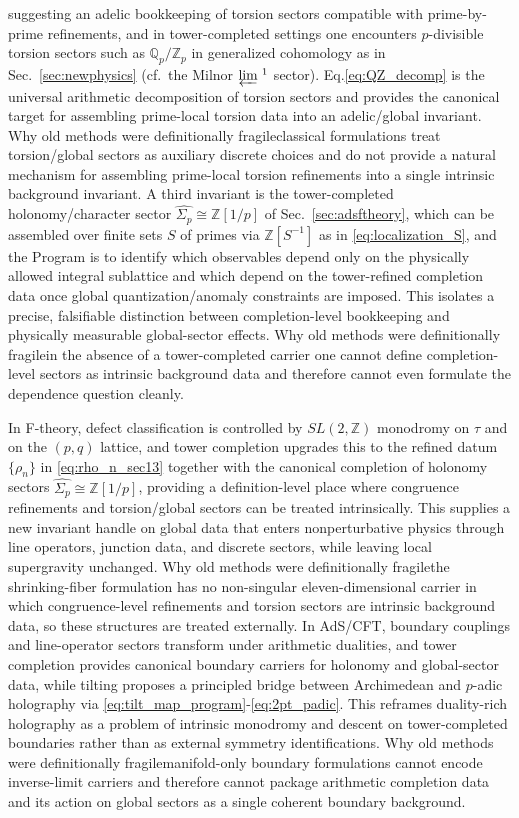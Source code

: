 \documentclass[11pt]{article}
\theoremstyle{remark}
\newcommand{\Z}{\mathbb{Z}}
\newcommand{\Q}{\mathbb{Q}}
\begin{document}
suggesting an adelic bookkeeping of torsion sectors compatible with prime-by-prime refinements, and in tower-completed settings one encounters \(p\)-divisible torsion sectors such as \(\Q_{p}/\Z_{p}\) in generalized cohomology as in Sec.~\ref{sec:newphysics} (cf.\ the Milnor \(\varprojlim{}^{\,1}\) sector). Eq.\eqref{eq:QZ_decomp} is the universal arithmetic decomposition of torsion sectors and provides the canonical target for assembling prime-local torsion data into an adelic/global invariant. Why old methods were definitionally fragile\:classical formulations treat torsion/global sectors as auxiliary discrete choices and do not provide a natural mechanism for assembling prime-local torsion refinements into a single intrinsic background invariant. A third invariant is the tower-completed holonomy/character sector \(\widehat{\Sigma_{p}}\cong \Z[1/p]\) of Sec.~\ref{sec:adsftheory}, which can be assembled over finite sets \(S\) of primes via \(\Z[S^{-1}]\) as in \eqref{eq:localization_S}, and the Program is to identify which observables depend only on the physically allowed integral sublattice and which depend on the tower-refined completion data once global quantization/anomaly constraints are imposed. This isolates a precise, falsifiable distinction between completion-level bookkeeping and physically measurable global-sector effects. Why old methods were definitionally fragile\:in the absence of a tower-completed carrier one cannot define completion-level sectors as intrinsic background data and therefore cannot even formulate the dependence question cleanly.

In F-theory, defect classification is controlled by \(SL(2,\Z)\) monodromy on \(\tau\) and on the \((p,q)\) lattice, and tower completion upgrades this to the refined datum \(\{\rho_{n}\}\) in \eqref{eq:rho_n_sec13} together with the canonical completion of holonomy sectors \(\widehat{\Sigma_{p}}\cong \Z[1/p]\), providing a definition-level place where congruence refinements and torsion/global sectors can be treated intrinsically. This supplies a new invariant handle on global data that enters nonperturbative physics through line operators, junction data, and discrete sectors, while leaving local supergravity unchanged. Why old methods were definitionally fragile\:the shrinking-fiber formulation has no non-singular eleven-dimensional carrier in which congruence-level refinements and torsion sectors are intrinsic background data, so these structures are treated externally. In AdS/CFT, boundary couplings and line-operator sectors transform under arithmetic dualities, and tower completion provides canonical boundary carriers for holonomy and global-sector data, while tilting proposes a principled bridge between Archimedean and \(p\)-adic holography via \eqref{eq:tilt_map_program}-\eqref{eq:2pt_padic}. This reframes duality-rich holography as a problem of intrinsic monodromy and descent on tower-completed boundaries rather than as external symmetry identifications. Why old methods were definitionally fragile\:manifold-only boundary formulations cannot encode inverse-limit carriers and therefore cannot package arithmetic completion data and its action on global sectors as a single coherent boundary background.
\end{document}
